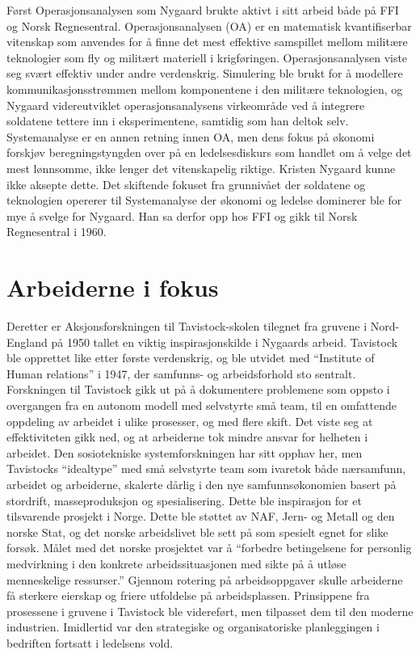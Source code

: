 \documentclass[../../main.tex]{subfiles}
\begin{document}
Først Operasjonsanalysen som Nygaard brukte aktivt i sitt arbeid både på FFI og Norsk Regnesentral. Operasjonsanalysen (OA) er en matematisk kvantifiserbar vitenskap som anvendes for å finne det mest effektive samspillet mellom militære teknologier som fly og militært materiell i krigføringen. Operasjonsanalysen viste seg svært effektiv under andre verdenskrig. Simulering ble brukt for å modellere kommunikasjonsstrømmen mellom komponentene i den militære teknologien, og Nygaard videreutviklet operasjonsanalysens virkeområde ved å integrere soldatene tettere inn i eksperimentene, samtidig som han deltok selv. Systemanalyse er en annen retning innen OA, men dens fokus på økonomi forskjøv beregningstyngden over på en ledelsesdiskurs som handlet om å velge det mest lønnsomme, ikke lenger det vitenskapelig riktige. Kristen Nygaard kunne ikke aksepte dette. Det skiftende fokuset fra grunnivået der soldatene og teknologien opererer til Systemanalyse der økonomi og ledelse dominerer ble for mye å svelge for Nygaard. Han sa derfor opp hos FFI og gikk til Norsk Regnesentral i 1960.

\section{Arbeiderne i fokus}

Deretter er Aksjonsforskningen til Tavistock-skolen tilegnet fra gruvene i Nord-England på 1950 tallet en viktig inspirasjonskilde i Nygaards arbeid. Tavistock ble opprettet like etter første verdenskrig, og ble utvidet med ``Institute of Human relations'' i 1947, der samfunns- og arbeidsforhold sto sentralt. Forskningen til Tavistock gikk ut på å dokumentere problemene som oppsto i overgangen fra en autonom modell med selvstyrte små team, til en omfattende oppdeling av arbeidet i ulike prosesser, og med flere skift. Det viste seg at effektiviteten gikk ned, og at arbeiderne tok mindre ansvar for helheten i arbeidet. Den sosiotekniske systemforskningen har sitt opphav her, men Tavistocks ``idealtype'' med små selvstyrte team som ivaretok både nærsamfunn, arbeidet og arbeiderne, skalerte dårlig i den nye samfunnsøkonomien basert på stordrift, masseproduksjon og spesialisering. Dette ble inspirasjon for et tilsvarende prosjekt i Norge. Dette ble støttet av NAF, Jern- og Metall og den norske Stat, og det norske arbeidslivet ble sett på som spesielt egnet for slike forsøk. Målet med det norske prosjektet var å ``forbedre betingelsene for personlig medvirkning i den konkrete arbeidssituasjonen med sikte på å utløse menneskelige ressurser.'' Gjennom rotering på arbeidsoppgaver skulle arbeiderne få sterkere eierskap og friere utfoldelse på arbeidsplassen. Prinsippene fra prosessene i gruvene i Tavistock ble videreført, men tilpasset dem til den moderne industrien. Imidlertid var den strategiske og organisatoriske planleggingen i bedriften fortsatt i ledelsens vold.
\end{document}
